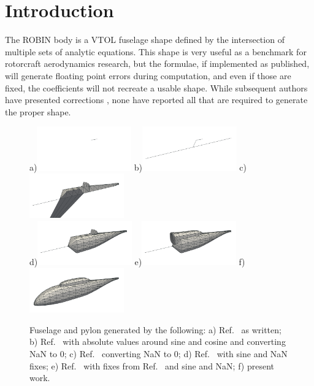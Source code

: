 \documentclass[12pt]{article}
\begin{document}
\section{Introduction}
The ROBIN body is a VTOL fuselage shape \cite{nasa80051,nasa87762,mineckgorton,nasa1999}
defined by the intersection of multiple sets of analytic equations.
This shape is very useful as a benchmark for rotorcraft aerodynamics research,
but the formulae, if implemented as published,
will generate floating point errors during computation,
and even if those are fixed, the coefficients will not recreate a usable shape.
While subsequent authors have presented corrections \cite{nasa87762,mineckgorton},
none have reported all that are required to generate the proper shape.
\begin{figure}[b]
\begin{centering}
a)\includegraphics[width=1.6in]{img_figa.png}
b)\includegraphics[width=1.6in]{img_figc.png}
c)\includegraphics[width=1.6in]{img_figd.png} \\
d)\includegraphics[width=1.6in]{img_fige.png}
e)\includegraphics[width=1.6in]{img_figf.png}
f)\includegraphics[width=1.6in]{img_figg.png}
\caption{Fuselage and pylon generated by the following: a) Ref.~\cite{nasa80051} as written; b) Ref.~\cite{nasa80051} with absolute values around sine and cosine and converting NaN to 0; c) Ref.~\cite{nasa87762} converting NaN to 0; d) Ref.~\cite{nasa87762} with sine and NaN fixes; e) Ref.~\cite{mineckgorton} with fixes from Ref.~\cite{nasa87762} and sine and NaN; f) present work.}
\label{allforms}
\end{centering}\end{figure}%
\end{document}
